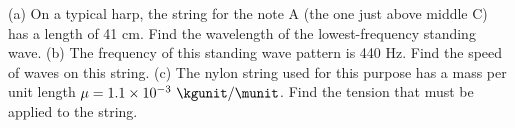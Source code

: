 (a) On a typical harp, the string for the note A (the one just above middle C)
has a length of 41 cm. Find the wavelength of the lowest-frequency standing wave.\answercheck\hwendpart
(b) The frequency of this standing wave pattern is 440 Hz. Find the speed of waves on this string.\answercheck\hwendpart
(c) The nylon string used for this purpose has a mass per unit length $\mu=1.1\times10^{-3}\ \kgunit/\munit$.
Find the tension that must be applied to the string.\answercheck\hwendpart

